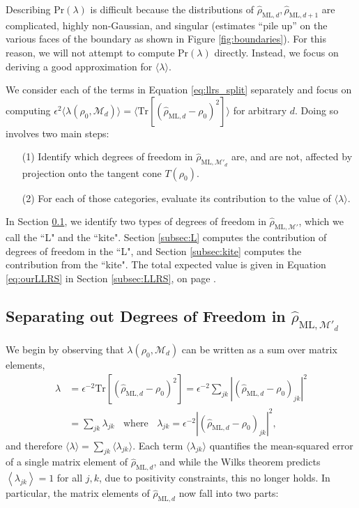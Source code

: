 \documentclass[aps,pra, twocolumn]{revtex4-1}
\newcommand{\M}{\mathcal{M}}
\newcommand{\expect}[1]{\ensuremath{\left\langle#1\right\rangle}}
\newcommand{\rhohat}{\hat{\rho}}
\newcommand{\rhoML}[1]{\rhohat_{\scriptscriptstyle{\mathrm{ML},#1}}}
\begin{document}
Describing $\mathrm{Pr}(\lambda)$ is difficult because the distributions of $\rhoML{d}, \rhoML{d+1}$ are complicated, highly non-Gaussian, and singular (estimates ``pile up'' on the various faces of the boundary as shown in Figure \ref{fig:boundaries}).  For this reason, we will not attempt to compute $\mathrm{Pr}(\lambda)$ directly.  Instead, we focus on deriving a good approximation for $\langle \lambda \rangle$.

We consider each of the terms in Equation \eqref{eq:llrs_split} separately and focus on computing $\epsilon^{2}\langle \lambda(\rho_{0}, \M_{d}) \rangle = \langle \mathrm{Tr}[(\rhoML{d}  - \rho_{0})^{2}] \rangle$ for arbitrary $d$.
Doing so involves two main steps:
\begin{itemize}
\item[(1)] Identify which degrees of freedom in $\rhoML{\M'_{d}}$ are, and are not, affected by projection onto the tangent cone $T(\rho_{0})$.
\item[(2)] For each of those categories, evaluate its contribution to the value of $\langle \lambda \rangle$.
\end{itemize}

In Section \ref{subsec:dof}, we identify two types of degrees of freedom in $\rhoML{\M'}$, which we call the ``L" and the ``kite". Section \ref{subsec:L} computes the contribution of degrees of freedom in the ``L", and Section \ref{subsec:kite} computes the contribution from the ``kite". The total expected value is given in Equation \eqref{eq:ourLLRS} in Section \ref{subsec:LLRS}, on page \pageref{eq:ourLLRS}.

\subsection{Separating out Degrees of Freedom in $\rhoML{\M'_{d}}$}
\label{subsec:dof}
We begin by observing that $\lambda(\rho_{0}, \M_{d})$ can be written as a sum over matrix elements,
\begin{align}
\nonumber \lambda &=\epsilon^{-2}\mathrm{Tr}[(\rhoML{d} - \rho_{0})^{2}] = \epsilon^{-2}\sum_{jk}|(\rhoML{d}- \rho_{0} )_{jk}|^{2}\\
\nonumber &= \sum_{jk}\lambda_{jk}~~~~\text{where}~~~~\lambda_{jk} = \epsilon^{-2}|(\rhoML{d} - \rho_{0} )_{jk} |^{2},
\end{align}
and therefore $\langle \lambda \rangle = \sum_{jk}\langle\lambda_{jk}\rangle$.  Each term $\langle \lambda_{jk}\rangle$ quantifies the mean-squared error of a single matrix element of $\rhoML{d}$, and while the Wilks theorem predicts $\expect{\lambda_{jk}}=1$ for all $j,k$, due to positivity constraints, this no longer holds. In particular, the matrix elements of $\rhoML{d}$ now fall into two parts:
\end{document}
